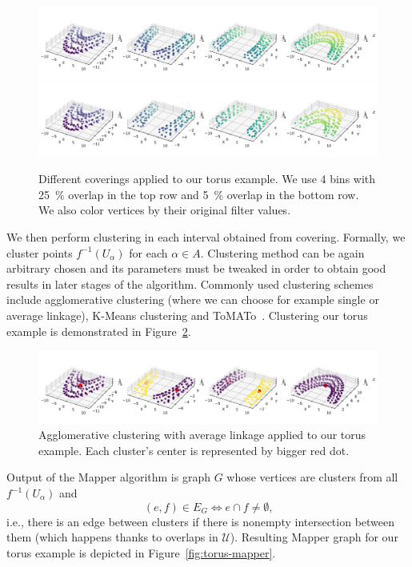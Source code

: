 \documentclass{article}
\begin{document}
\begin{figure}[ht]
    \centering
    \includegraphics[width=0.9\columnwidth]{torus-partition-4-25}
    \includegraphics[width=0.9\columnwidth]{torus-partition-4-05}
    \caption{Different coverings applied to our torus example.
        We use 4 bins with 25~\% overlap in the top row and 5~\% overlap in the bottom row.
        We also color vertices by their original filter values.}
    \label{fig:torus-cover}
\end{figure}

We then perform clustering in each interval obtained from covering.
Formally, we cluster points $f^{-1}(U_\alpha)$ for each $\alpha \in A$.
Clustering method can be again arbitrary chosen and its parameters must be tweaked in order to obtain good results in later stages of the algorithm.
Commonly used clustering schemes include agglomerative clustering (where we can choose for example single or average linkage), K-Means clustering and ToMATo~\cite{tomato}.
Clustering our torus example is demonstrated in Figure~\ref{fig:torus-cluster}.

\begin{figure}[ht]
    \centering
    \includegraphics[width=0.9\columnwidth]{torus-clustering}
    \caption{Agglomerative clustering with average linkage applied to our torus example.
        Each cluster's center is represented by bigger red dot.}
    \label{fig:torus-cluster}
\end{figure}

Output of the Mapper algorithm is graph $G$ whose vertices are clusters from all $f^{-1}(U_\alpha)$ and
$$
    (e, f) \in E_G \Leftrightarrow e \cap f \neq \emptyset \mbox{,}
$$
i.e., there is an edge between clusters if there is nonempty intersection between them (which happens thanks to overlaps in $\mathcal{U}$).
Resulting Mapper graph for our torus example is depicted in Figure~\ref{fig:torus-mapper}.
\end{document}
